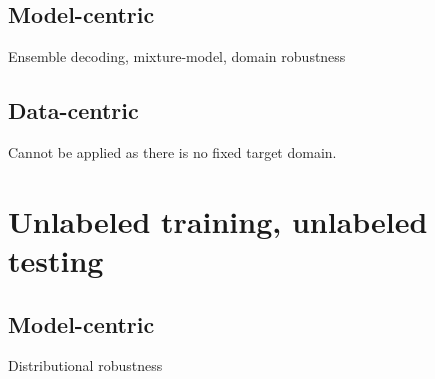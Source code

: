 \subsection{Model-centric}
Ensemble decoding, mixture-model, domain robustness
\cite{Muller20domain}
\subsection{Data-centric}
Cannot be applied as there is no fixed target domain. 
\section{Unlabeled training, unlabeled testing}
\label{sec:case4}
\subsection{Model-centric}
Distributional robustness
